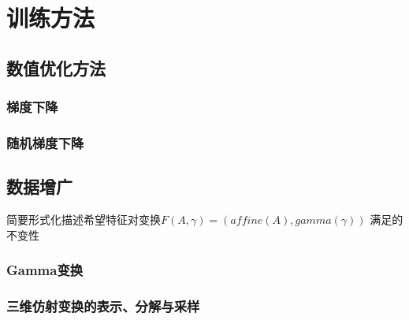\section{训练方法}

\subsection{数值优化方法}

\subsubsection{梯度下降}
\subsubsection{随机梯度下降}

\subsection{数据增广}
简要形式化描述希望特征对变换$F(A, \gamma)=(affine(A), gamma(\gamma))$
满足的不变性

\subsubsection{Gamma变换}

\subsubsection{三维仿射变换的表示、分解与采样}


